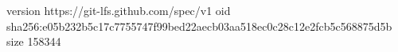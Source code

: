 version https://git-lfs.github.com/spec/v1
oid sha256:e05b232b5c17c7755747f99bed22aecb03aa518ec0c28c12e2fcb5c568875d5b
size 158344
